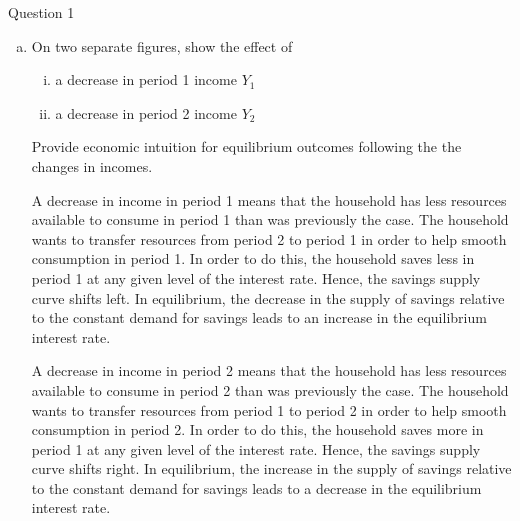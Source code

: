 \documentclass[a4paper]{article}
\newif\IfInSansMode
\begin{document}
\begin{questionbox}{Question 1}
\begin{enumerate}[(a)]
\begin{explanationbox}
\begin{figure}[H]
				\end{figure}
			\end{explanationbox}
			\item On two separate figures, show the effect of 
			\begin{enumerate}[(i)]
				\item a decrease in period 1 income \( Y_1 \)
				\item a decrease in period 2 income \( Y_2 \)
			\end{enumerate}
			Provide economic intuition for equilibrium outcomes following the the changes in incomes.
			\begin{explanationbox}
				A decrease in income in period 1 means that the household has less resources available to consume in period 1 than was previously the case. The household wants to transfer resources from period 2 to period 1 in order to help smooth consumption in period 1. In order to do this, the household saves less in period 1 at any given level of the interest rate. Hence, the savings supply curve shifts left. In equilibrium, the decrease in the supply of savings relative to the constant demand for savings leads to an increase in the equilibrium interest rate.
				\begin{figure}[H]
					\centering
				\end{figure}
				A decrease in income in period 2 means that the household has less resources available to consume in period 2 than was previously the case. The household wants to transfer resources from period 1 to period 2 in order to help smooth consumption in period 2. In order to do this, the household saves more in period 1 at any given level of the interest rate. Hence, the savings supply curve shifts right. In equilibrium, the increase in the supply of savings relative to the constant demand for savings leads to a decrease in the equilibrium interest rate.

\end{explanationbox}
\end{enumerate}
\end{questionbox}
\end{document}
